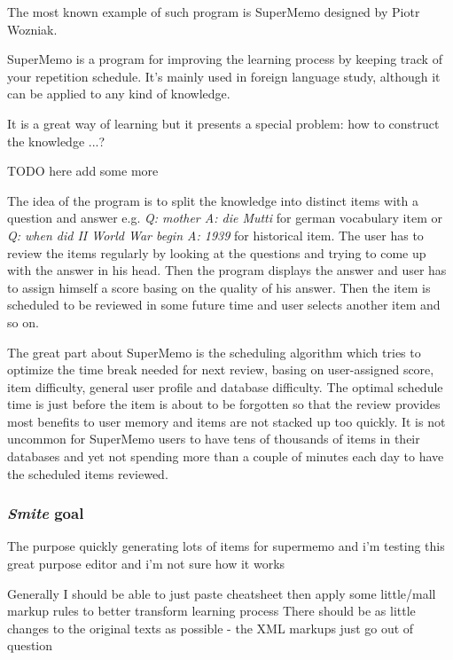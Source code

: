 \documentclass[a4paper,11pt]{article}
\newcommand{\smite}{\emph{\textbf{Smite{}}}}
\begin{document}
The most known example of such program is SuperMemo designed by Piotr Wozniak.


SuperMemo is a program for improving the learning process by keeping track of
your repetition schedule. It's mainly used in foreign language study, although
it can be applied to any kind of knowledge.

It is a great way of learning but it presents a special problem: how to
construct the knowledge ...?

TODO here add some more

The idea of the program is to split the knowledge into distinct items with a
question and answer e.g. \emph{Q: mother A: die Mutti} for german vocabulary
item or \emph{Q: when did II World War begin A: 1939} for historical item.  The
user has to review the items regularly by looking at the questions and trying
to come up with the answer in his head. Then the program displays the answer
and user has to assign himself a score basing on the quality of his answer.
Then the item is scheduled to be reviewed in some future time and user selects
another item and so on.

The great part about SuperMemo is the scheduling algorithm which tries to
optimize the time break needed for next review, basing on user-assigned score,
item difficulty, general user profile and database difficulty. The optimal
schedule time is just before the item is about to be forgotten so that the
review provides most benefits to user memory and items are not stacked up too
quickly.  It is not uncommon for SuperMemo users to have tens of thousands of
items in their databases and yet not spending more than a couple of minutes
each day to have the scheduled items reviewed.









\subsubsection{\smite{} goal}

The purpose quickly generating lots of items for supermemo  and i'm testing
this great purpose editor and i'm not sure how it works



Generally I should be able to just paste cheatsheet then apply some little/mall
markup rules to better transform learning process There should be as little
changes to the original texts as possible - the XML markups just go out of
question
\end{document}
